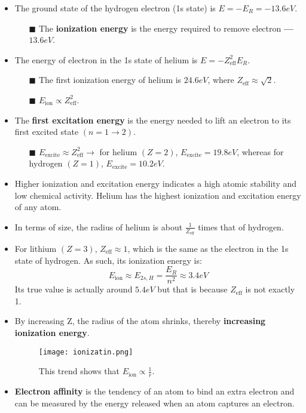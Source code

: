 \documentclass[12pt, letterpaper, twoside]{article}
\begin{document}
\begin{itemize}
    \item The ground state of the hydrogen electron (1s state) is $E = -E_R = -13.6 eV$.
    \begin{itemize}
        \item[$\blacksquare$] The \textbf{ionization energy} is the energy required to remove electron \textbf{---} $13.6 eV$.
    \end{itemize}
    \item The energy of electron in the 1s state of helium is $E = -Z_{\text{eff}}^2E_R$.
    \begin{itemize}
        \item[$\blacksquare$] The first ionization energy of helium is $24.6eV$, where $Z_{\text{eff}} \approx \sqrt{2}$.
        \item[$\blacksquare$] $E_{\text{ion}} \propto Z_{\text{eff}}^2$.
    \end{itemize}
    \item The \textbf{first excitation energy} is the energy needed to lift an electron to its first excited state $(n = 1 \rightarrow 2)$.
    \begin{itemize}
        \item[$\blacksquare$] $E_{\text{excite}} \approx Z_{\text{eff}}^2 \rightarrow$ for helium $(Z = 2)$, $E_{\text{excite}} = 19.8 eV$, whereas for hydrogen $(Z = 1)$, $E_{\text{excite}} = 10.2 eV$.  
    \end{itemize}
    \item Higher ionization and excitation energy indicates a high atomic stability and low chemical activity. Helium has the highest ionization and excitation energy of any atom.
    \item In terms of size, the radius of helium is about $\frac{1}{Z_{\text{eff}}}$ times that of hydrogen. 
    \item For lithium $(Z=3)$, $Z_{\text{eff}} \approx 1$, which is the same as the electron in the 1s state of hydrogen. As such, its ionization energy is:
    \begin{equation*}
        E_{\text{ion}} \approx E_{2s, H} = \frac{E_R}{n^2} \approx 3.4eV
    \end{equation*}
    Its true value is actually around $5.4eV$ but that is because $Z_{\text{eff}}$ is not exactly 1.
    \item By increasing Z, the radius of the atom shrinks, thereby \textbf{increasing ionization energy}.
    \begin{figure}[!ht]
        \centering
        \texttt{[image: ionizatin.png]}
        \caption{This trend shows that $E_{\text{ion}} \propto \frac{1}{r}$.}
    \end{figure}
    \item \textbf{Electron affinity} is the tendency of an atom to bind an extra electron and can be measured by the energy released when an atom captures an electron.
\end{itemize}
\vfill\pagebreak
\end{document}
